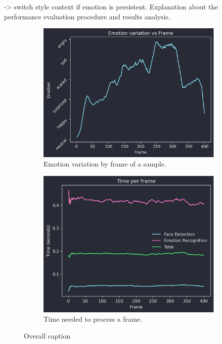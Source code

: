 \documentclass[journal,onecolumn]{IEEEtran}
\begin{document}
-> switch style context if
  emotion is persistent.
Explanation about the performance evaluation procedure and results analysis.

\begin{figure}[t]
  \centering
     \begin{subfigure}{0.49\linewidth} \centering
       \includegraphics[scale=0.49]{resources/emotionvsframe.png}
       \caption{Emotion variation by frame of a sample.}\label{fig:figA}
     \end{subfigure}
     \begin{subfigure}{0.49\linewidth} \centering
       \includegraphics[scale=0.49]{resources/timeseriesplot.png}
       \caption{Time needed to process a frame.}\label{fig:figB}
     \end{subfigure}
  \caption{Overall caption} \label{fig:emotionandtime}
  \end{figure}
\end{document}

